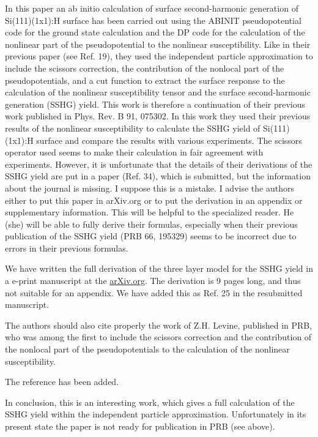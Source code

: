 \documentclass[11pt]{article}
\begin{document}
In this paper an ab initio calculation of surface second-harmonic generation of
Si(111)(1x1):H surface has been carried out using the ABINIT pseudopotential
code for the ground state calculation and the DP code for the calculation of the
nonlinear part of the pseudopotential to the nonlinear susceptibility. Like in
their previous paper (see Ref. 19), they used the independent particle
approximation to include the scissors correction, the contribution of the
nonlocal part of the pseudopotentials, and a cut function to extract the surface
response to the calculation of the nonlinear susceptibility tensor and the
surface second-harmonic generation (SSHG) yield. This work is therefore a
continuation of their previous work published in Phys. Rev. B 91, 075302. In
this work they used their previous results of the nonlinear susceptibility to
calculate the SSHG yield of Si(111)(1x1):H surface and compare the results with
various experiments. The scissors operator used seems to make their calculation
in fair agreement with experiments. However, it is unfortunate that the details
of their derivations of the SSHG yield are put in a paper (Ref. 34), which is
submitted, but the information about the journal is missing. I suppose this is a
mistake. I advise the authors either to put this paper in arXiv.org or to put
the derivation in an appendix or supplementary information. This will be helpful
to the specialized reader. He (she) will be able to fully derive their formulas,
especially when their previous publication of the SSHG yield (PRB 66, 195329)
seems to be incorrect due to errors in their previous formulas.
\begin{shaded}\label{ref2.01}
We have written the full derivation of the three layer model for the SSHG yield
in a e-print manuscript at the
\href{https://arxiv.org/abs/1604.07722}{arXiv.org}. The derivation is 9 pages
long, and thus not suitable for an appendix. We have added this as Ref. 25 in
the resubmitted manuscript.
\end{shaded}

The authors should also cite properly the work of Z.H. Levine, published in PRB,
who was among the first to include the scissors correction and the contribution
of the nonlocal part of the pseudopotentials to the calculation of the nonlinear
susceptibility.
\begin{shaded}\label{ref2.02}
The reference has been added.
\end{shaded}

In conclusion, this is an interesting work, which gives a full calculation of
the SSHG yield within the independent particle approximation. Unfortunately in
its present state the paper is not ready for publication in PRB (see above).
\end{document}
